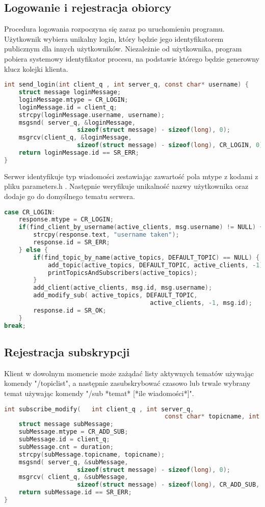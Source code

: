 \documentclass{article}
\begin{document}
	\subsection{Logowanie i rejestracja obiorcy}
	Procedura logowania rozpoczyna się zaraz po uruchomieniu programu. Użytkownik wybiera unikalny login, który będzie jego identyfikatorem publicznym dla innych użytkowników. Niezależnie od użytkownika, program pobiera systemowy identyfikator procesu, na podstawie którego będzie generowny klucz kolejki klienta.
	\begin{lstlisting}[language=c,
		numbersep=5pt,
		tabsize=2,
		showstringspaces=false]
int send_login(int client_q , int server_q, const char* username) {
	struct message loginMessage;
	loginMessage.mtype = CR_LOGIN;
	loginMessage.id = client_q;
	strcpy(loginMessage.username, username);
	msgsnd( server_q, &loginMessage, 
					sizeof(struct message) - sizeof(long), 0);
	msgrcv(client_q, &loginMessage, 
					sizeof(struct message) - sizeof(long), CR_LOGIN, 0);
	return loginMessage.id == SR_ERR;
}
	\end{lstlisting}
	Serwer identyfikuje typ wiadomości zestawiając zawartość pola mtype z kodami z pliku parameters.h . Następnie weryfikuje unikalność nazwy użytkownika oraz dodaje go do domyślnego tematu serwera.
	\begin{lstlisting}[language=c,
		numbersep=5pt,
		tabsize=2,
		showstringspaces=false]
case CR_LOGIN:
	response.mtype = CR_LOGIN;
	if(find_client_by_username(active_clients, msg.username) != NULL) {
		strcpy(response.text, "username taken");
		response.id = SR_ERR;
	} else {
		if(find_topic_by_name(active_topics, DEFAULT_TOPIC) == NULL) {
			add_topic(active_topics, DEFAULT_TOPIC, active_clients, -1);
			printTopicsAndSubscribers(active_topics);
		}
		add_client(active_clients, msg.id, msg.username);
		add_modify_sub(	active_topics, DEFAULT_TOPIC,
										active_clients, -1, msg.id);
		response.id = SR_OK;
	}
break;
	\end{lstlisting}
	\newpage
	\subsection{Rejestracja subskrypcji}
	Klient w dowolnym momencie może zażądać listy aktywnych tematów używając komendy "/topiclist", a następnie zasubskrybować czasowo lub trwale wybrany temat używając komendy "/sub *temat* [*ile wiadomości*]".
	\begin{lstlisting}[language=c,
		numbersep=5pt,
		tabsize=2,
		showstringspaces=false]
int subscribe_modify(	int client_q , int server_q, 
											const char* topicname, int duration) {
	struct message subMessage;
	subMessage.mtype = CR_ADD_SUB;
	subMessage.id = client_q;
	subMessage.cnt = duration;
	strcpy(subMessage.topicname, topicname);
	msgsnd(	server_q, &subMessage, 
					sizeof(struct message) - sizeof(long), 0);
	msgrcv(	client_q, &subMessage, 
					sizeof(struct message) - sizeof(long), CR_ADD_SUB, 0);
	return subMessage.id == SR_ERR;
}
	\end{lstlisting}
\end{document}
